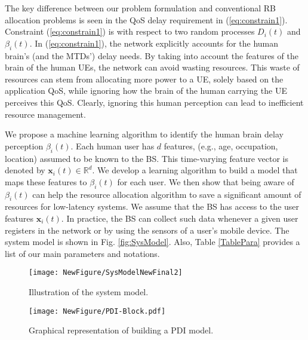 \documentclass[journal,draftclsnofoot,onecolumn,12pt]{IEEEtran}%
\newcommand{\xb}{\boldsymbol{x}}
\begin{document}
	The key difference between our problem formulation and conventional RB allocation problems \cite{Rui2017APCC} is  seen in the QoS delay requirement in (\ref{eq:constrain1}). 
Constraint (\ref{eq:constrain1}) is with respect to two random processes $D_i(t)$ and $\beta_i(t)$. In (\ref{eq:constrain1}), the network explicitly accounts for the human brain's (and the MTDs') delay needs. By taking into account the features of the brain of the human UEs, the network can avoid wasting resources. This waste of resources can stem from allocating more power to a UE, solely based on the application  QoS, while ignoring how the brain of the human carrying the UE perceives this QoS. Clearly, ignoring this human perception can lead to inefficient resource management.
	
	{We propose a machine learning algorithm to identify the human brain delay perception $\beta_i(t)$.}
	Each human user has $d$ features, (e.g., age, occupation, location) assumed to be known to the BS. This time-varying feature vector is denoted by $\xb_i(t) \in \mathds{R}^d$. We develop a learning algorithm to build a model that maps these features to $\beta_i(t)$ for each user. We  then show that being aware of $\beta_i(t)$ can help the resource allocation algorithm to save a significant amount of resources for low-latency systems. 
	{We assume that the BS has access to the user features $\xb_i(t)$. In practice, the BS can collect such data whenever a given user registers in the network or by using the sensors of a user's mobile device. The system model is shown in Fig. \ref{fig:SysModel}}. Also, Table \ref{TablePara} provides a list of our main parameters and notations.
	
	

	
		\begin{figure}[!t]
    \begin{minipage}{0.49\textwidth}
	\centering
	\texttt{[image: NewFigure/SysModelNewFinal2]}
	\caption{Illustration of the system model.}
	\label{fig:SysModel}

	\end{minipage}
    \hfill
\begin{minipage}{0.49\textwidth}
	\centering
	\texttt{[image: NewFigure/PDI-Block.pdf]}
	\caption{{Graphical representation of building a  PDI model.}}
	\label{fig:PDImodel}
        \end{minipage}
	\end{figure}
	
	
\end{document}
